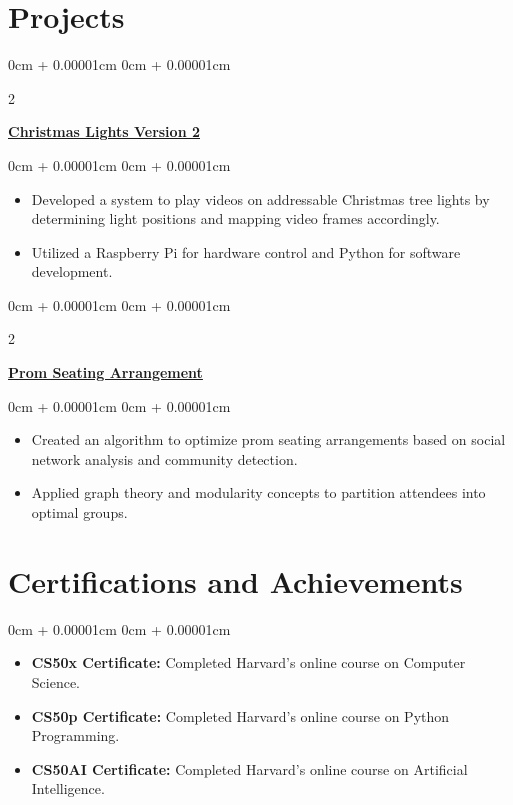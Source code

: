 \documentclass[10pt, letterpaper]{article}
\newenvironment{highlights}{
    \begin{itemize}[
        topsep=0.10cm,
        parsep=0.10cm,
        partopsep=0pt,
        itemsep=0pt,
        leftmargin=0cm + 10pt
    ]
}{
    \end{itemize}
}
\newenvironment{onecolentry}{
    \begin{adjustwidth}{
        0cm + 0.00001cm
    }{
        0cm + 0.00001cm
    }
}{
    \end{adjustwidth}
}
\newenvironment{twocolentry}[2][]{
    \onecolentry
    \def\secondColumn{#2}
    \setcolumnwidth{\fill, 5.5 cm} %
    \begin{paracol}{2}
}{
    \switchcolumn \raggedleft \secondColumn
    \end{paracol}
    \endonecolentry
}
\begin{document}
    \section{Projects}
    \begin{twocolentry}{}
        \textbf{\href{https://blucardin.github.io/projects/christmas-lights-v2/}{Christmas Lights Version 2}}
    \end{twocolentry}
    \vspace{0.10cm}
    \begin{onecolentry}
        \begin{highlights}
            \item Developed a system to play videos on addressable Christmas tree lights by determining light positions and mapping video frames accordingly.
            \item Utilized a Raspberry Pi for hardware control and Python for software development.
        \end{highlights}
    \end{onecolentry}

    \vspace{0.2cm}

    \begin{twocolentry}{}
        \textbf{\href{https://blucardin.github.io/projects/prom_seating/}{Prom Seating Arrangement}}
    \end{twocolentry}
    \vspace{0.10cm}
    \begin{onecolentry}
        \begin{highlights}
            \item Created an algorithm to optimize prom seating arrangements based on social network analysis and community detection.
            \item Applied graph theory and modularity concepts to partition attendees into optimal groups.
        \end{highlights}
    \end{onecolentry}

    \section{Certifications and Achievements}
    \begin{onecolentry}
        \begin{highlights}
            \item \textbf{CS50x Certificate:} Completed Harvard's online course on Computer Science.
            \item \textbf{CS50p Certificate:} Completed Harvard's online course on Python Programming.
            \item \textbf{CS50AI Certificate:} Completed Harvard's online course on Artificial Intelligence.
        \end{highlights}
    \end{onecolentry}
\end{document}
